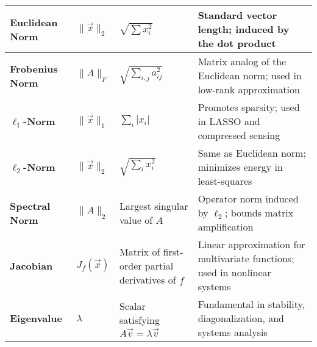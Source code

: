 \documentclass[12pt]{article}
\begin{document}
\begin{longtable}{|>{\bfseries}m{3cm}|m{2.5cm}|p{4.6cm}|p{4.6cm}|}
\hline
Euclidean Norm & $\lVert\vec{x}\rVert_2$ & $\sqrt{\sum x_i^2}$ & Standard vector length; induced by the dot product \\
\hline
Frobenius Norm & $\lVert A\rVert_F$ & $\sqrt{\sum_{i,j} a_{ij}^2}$ & Matrix analog of the Euclidean norm; used in low-rank approximation \\
\hline
$\ell_1$-Norm & $\lVert\vec{x}\rVert_1$ & $\sum_i |x_i|$ & Promotes sparsity; used in LASSO and compressed sensing \\
\hline
$\ell_2$-Norm & $\lVert\vec{x}\rVert_2$ & $\sqrt{\sum_i x_i^2}$ & Same as Euclidean norm; minimizes energy in least-squares \\
\hline
Spectral Norm & $\lVert A\rVert_2$ & Largest singular value of $A$ & Operator norm induced by $\ell_2$; bounds matrix amplification \\
\hline
Jacobian & $J_f(\vec{x})$ & Matrix of first-order partial derivatives of $f$ & Linear approximation for multivariate functions; used in nonlinear systems \\
\hline
Eigenvalue & $\lambda$ & Scalar satisfying $A\vec{v} = \lambda\vec{v}$ & Fundamental in stability, diagonalization, and systems analysis \\

\end{longtable}
\end{document}
